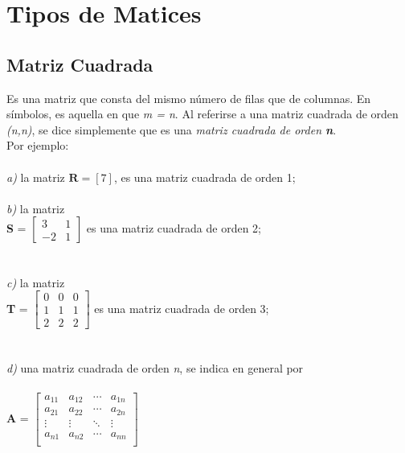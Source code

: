 \documentclass[a4paper,12pt]{report} %
\begin{document}
\chapter{Tipos de Matices}

\section{Matriz Cuadrada}
Es una matriz que consta del mismo número de filas que de columnas.
En símbolos, es aquella en que \textit{m = n}. Al referirse a una matriz cuadrada de orden \textit{(n,n)}, se dice simplemente que es una \textit{matriz cuadrada de orden \textbf{n}}.\\
Por ejemplo:
\\ \\
\textit{a)}  la matriz \(\mathbf{R} = \left[ 7 \right]\), es una matriz cuadrada de orden 1;\\ \\
\textit{b)}  la matriz\\ 

\textbf{S} =
$\begin{bmatrix}
3 & 1 \\
-2 & 1
\end{bmatrix}$
es una matriz cuadrada de orden 2;\\ \\
\\\textit{c)}  la matriz\\ 

\textbf{T} =
$\begin{bmatrix}
0 & 0 & 0 \\
1 & 1 & 1 \\
2 & 2 & 2
\end{bmatrix}$
es una matriz cuadrada de orden 3; \\ \\ 
\\\textit{d)}  una matriz cuadrada de orden \textit{n}, se indica en general por\\ \\
\textbf{A} =  
$\begin{bmatrix}
a_{11} & a_{12} & \cdots & a_{1n} \\
a_{21} & a_{22} & \cdots & a_{2n} \\
\vdots & \vdots & \ddots & \vdots \\
a_{n1} & a_{n2} & \cdots & a_{nn} \\
\end{bmatrix}$
\\
\end{document}
